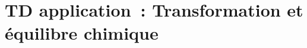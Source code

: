 \documentclass[../../main/main.tex]{subfiles}
\begin{document}
\setcounter{chapter}{1}


\chapter{
  {TD application~: Transformation et \'equilibre chimique}}

\resetQ


\resetQ


\resetQ


\resetQ


\resetQ

\end{document}
